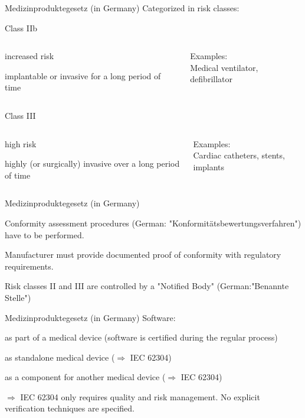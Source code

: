 \begin{frame}{Medizinproduktegesetz (in Germany)}
	Categorized in risk classes:	
	\begin{block}{Class IIb}
		\begin{columns}[c]
			\column{2in}
			\begin{beameritemize}
				\item increased risk
				\item implantable or invasive for a long period of time
			\end{beameritemize}	
			\column{2in}
			Examples:\\
			Medical ventilator, defibrillator
		\end{columns}		
	\end{block}
	
	\begin{block}{Class III}
		\begin{columns}[c]
			\column{2in}
			\begin{beameritemize}
				\item high risk
				\item highly (or surgically) invasive over a long period of time
			\end{beameritemize}
			\column{2in}
			Examples:\\
			Cardiac catheters, stents, implants
		\end{columns}	
	
	\end{block}
\end{frame}



\begin{frame}{Medizinproduktegesetz (in Germany)}
	\begin{beameritemize}
		\item Conformity assessment procedures (German: "Konformitätsbewertungsverfahren") have to be performed.
		\item Manufacturer must provide documented proof of conformity with regulatory requirements.
		\item Risk classes II and III are controlled by a "Notified Body" (German:"Benannte Stelle")
	\end{beameritemize}
\end{frame}


\begin{frame}{Medizinproduktegesetz (in Germany)}
	Software:
	\begin{beameritemize}
		\item as part of a medical device (software is certified during the regular process)
		\item as standalone medical device ($\Rightarrow$ IEC 62304)
		\item as a component for another medical device ($\Rightarrow$ IEC 62304)
	\end{beameritemize}
	\xxx
	$\Rightarrow$ IEC 62304 only requires quality and risk management. No explicit verification techniques are specified.

\end{frame}

